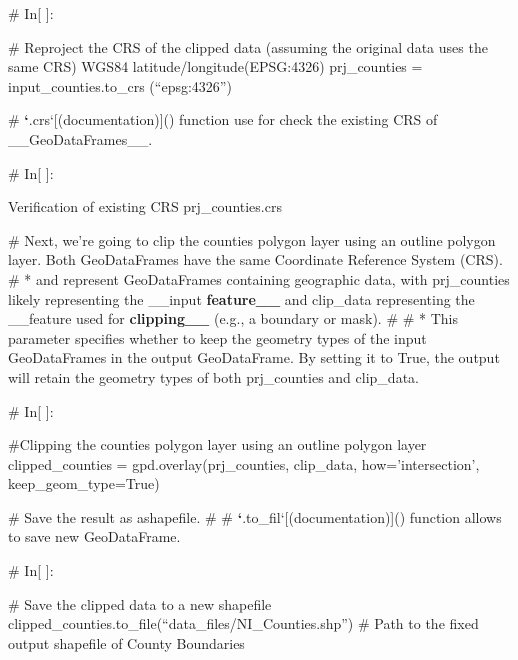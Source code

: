 \documentclass[letterpaper,10pt,english]{sphinxmanual}
\begin{document}
\sphinxAtStartPar
\# In{[} {]}:

\sphinxAtStartPar
\# Re\sphinxhyphen{}project the CRS of the clipped data (assuming the original data uses the same CRS) WGS84 latitude/longitude(EPSG:4326)
prj\_counties = input\_counties.to\_crs (“epsg:4326”)

\sphinxAtStartPar
\# {\color{red}\bfseries{}`}.crs`{[}(documentation){]}() function use for check the existing CRS  of \_\_GeoDataFrames\_\_.

\sphinxAtStartPar
\# In{[} {]}:

\sphinxAtStartPar
Verification of existing CRS
prj\_counties.crs

\sphinxAtStartPar
\# Next, we’re going to clip the counties polygon layer using an outline polygon layer. Both GeoDataFrames have the same Coordinate Reference System (CRS).
\# *  and  represent GeoDataFrames containing geographic data, with prj\_counties likely representing the \_\_input {\color{red}\bfseries{}feature\_\_} and clip\_data representing the \_\_feature used for {\color{red}\bfseries{}clipping\_\_} (e.g., a boundary or mask).
\#
\# *  This parameter specifies whether to keep the geometry types of the input GeoDataFrames in the output GeoDataFrame. By setting it to True, the output will retain the geometry types of both prj\_counties and clip\_data.

\sphinxAtStartPar
\# In{[} {]}:

\sphinxAtStartPar
\#Clipping the counties polygon layer using an outline polygon layer
clipped\_counties = gpd.overlay(prj\_counties, clip\_data, how=’intersection’, keep\_geom\_type=True)

\sphinxAtStartPar
\# Save the result as ashapefile.
\#
\# {\color{red}\bfseries{}`}.to\_fil`{[}(documentation){]}() function allows to save new GeoDataFrame.

\sphinxAtStartPar
\# In{[} {]}:

\sphinxAtStartPar
\# Save the clipped data to a new shapefile
clipped\_counties.to\_file(“data\_files/NI\_Counties.shp”) \# Path to the fixed output shapefile of County Boundaries
\end{document}
